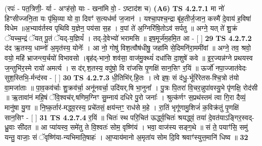 \documentclass[17pt]{extarticle}
\begin{document}
                      (रपः॑ - पत॒त्रिणी॒- र्या - अꣳह॑सो॒ याः - खना॑मि वो॒ - ऽष्टाद॑श च)  \textbf{(A6)} \newline \newline
                                        \textbf{ TS 4.2.7.1} \newline
                  मा नो॑ हिꣳसीज्जनि॒ता यः पृ॑थि॒व्या यो वा॒ दिवꣳ॑ स॒त्यध॑र्मा ज॒जान॑ । यश्चा॒पश्च॒न्द्रा बृ॑ह॒तीर्ज॒जान॒ कस्मै॑ दे॒वाय॑ ह॒विषा॑ विधेम ॥अ॒भ्याव॑र्तस्व पृथिवि य॒ज्ञेन॒ पय॑सा स॒ह । व॒पां ते॑ अ॒ग्निरि॑षि॒तोऽव॑ सर्पतु ॥ अग्ने॒ यत् ते॑ शु॒क्रं ॅयच्च॒न्द्रं ॅयत् पू॒तं ॅयद्-य॒ज्ञियं᳚ । तद्-दे॒वेभ्यो॑ भरामसि ॥ इष॒मूर्ज॑म॒हमि॒त आ - [  ] \textbf{  29} \newline
                  \newline
                                \textbf{ TS 4.2.7.2} \newline
                  द॑द ऋ॒तस्य॒ धाम्नो॑ अ॒मृत॑स्य॒ योनेः᳚ । आ नो॒ गोषु॑ विश॒त्वौष॑धीषु॒ जहा॑मि से॒दिमनि॑रा॒ममी॑वां ॥ अग्ने॒ तव॒ श्रवो॒ वयो॒ महि॑ भ्राजन्त्य॒र्चयो॑ विभावसो ।बृह॑द्-भानो॒ शव॑सा॒ वाज॑मु॒क्थ्यं॑ दधा॑सि दा॒शुषे॑ कवे ॥ इ॒र॒ज्यन्न॑ग्ने प्रथयस्व ज॒न्तुभि॑र॒स्मे रायो॑ अमर्त्य । स द॑र्.श॒तस्य॒ वपु॑षो॒ वि रा॑जसि पृ॒णक्षि॑ सान॒सिꣳ र॒यिं ॥ ऊर्जो॑ नपा॒ज्जात॑वेदः सुश॒स्तिभि॒-र्मन्द॑स्व - [  ] \textbf{  30} \newline
                  \newline
                                \textbf{ TS 4.2.7.3} \newline
                  धी॒तिभि॑र्.हि॒तः । त्वे इषः॒ सं द॑धु॒-र्भूरि॑रेतस-श्चि॒त्रो त॑यो वा॒मजा॑ताः ॥ पा॒व॒कव॑र्चाः शु॒क्रव॑र्चा॒ अनू॑नवर्चा॒ उदि॑यर्.षि भा॒नुना᳚ । पु॒त्रः पि॒तरा॑ वि॒चर॒न्नुपा॑वस्यु॒भे पृ॑णक्षि॒ रोद॑सी ॥ ऋ॒तावा॑नं महि॒षं ॅवि॒श्वच॑र्.षणिम॒ग्निꣳ सु॒म्नाय॑ दधिरे पु॒रो जनाः᳚ । श्रुत्क॑र्णꣳ स॒प्रथ॑स्तमं त्वा गि॒रा दैव्यं॒ मानु॑षा यु॒गा ॥ नि॒ष्क॒र्तार॑-मद्ध्व॒रस्य॒ प्रचे॑तसं॒ क्षय॑न्तꣳ॒॒ राध॑से म॒हे । रा॒तिं भृगू॑णामु॒शिजं॑ क॒विक्र॑तुं पृ॒णक्षि॑ सान॒सिꣳ - [  ] \textbf{  31} \newline
                  \newline
                                \textbf{ TS 4.2.7.4} \newline
                  र॒यिं ॥ चितः॑ स्थ परि॒चित॑ ऊर्द्ध्व॒चितः॑ श्रयद्ध्वं॒ तया॑ दे॒वत॑याऽङ्गिर॒स्वद्-ध्रु॒वाः सी॑दत ॥ आ प्या॑यस्व॒ समे॑तु ते वि॒श्वतः॑ सोम॒ वृष्णि॑यं । भवा॒ वाज॑स्य सङ्ग॒थे ॥ सं ते॒ पयाꣳ॑सि॒ समु॑ यन्तु॒ वाजाः॒ सं ॅवृष्णि॑या-न्यभिमाति॒षाहः॑ । आ॒प्याय॑मानो अ॒मृता॑य सोम दि॒वि श्रवाꣳ॑स्युत्त॒मानि॑ धिष्व ॥ \textbf{  32} \newline
                  \newline
\end{document}
